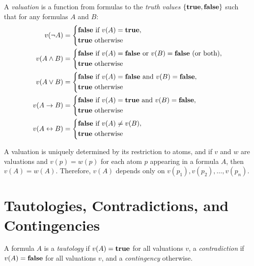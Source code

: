 \documentclass{article}
\begin{document}
\begin{definition}
    A \emph{valuation} is a function from formulas to the \emph{truth values} $\{ \mathbf{true}, \mathbf{false} \}$ such that for any formulas $A$ and $B$:
    \begin{align*}
        v(\neg A) & = \begin{dcases} \mathbf{false} \textrm{ if } v(A) = \mathbf{true}, \\ \mathbf{true} \textrm{ otherwise} \end{dcases} \\
        v(A \wedge B) & = \begin{dcases} \mathbf{false} \textrm{ if } v(A) = \mathbf{false} \textrm{ or } v(B) = \mathbf{false} \textrm{ (or both)}, \\ \mathbf{true} \textrm{ otherwise} \end{dcases} \\
        v(A \vee B) & = \begin{dcases} \mathbf{false} \textrm{ if } v(A) = \mathbf{false} \textrm{ and } v(B) = \mathbf{false}, \\ \mathbf{true} \textrm{ otherwise} \end{dcases} \\
        v(A \to B) & = \begin{dcases} \mathbf{false} \textrm{ if } v(A) = \mathbf{true} \textrm{ and } v(B) = \mathbf{false}, \\ \mathbf{true} \textrm{ otherwise}  \end{dcases} \\
        v(A \leftrightarrow B) & = \begin{dcases} \mathbf{false} \textrm{ if } v(A) \neq v(B), \\ \mathbf{true} \textrm{ otherwise} \end{dcases}
    \end{align*}
\end{definition}

\begin{proposition}
A valuation is uniquely determined by its restriction to atoms, and if $v$ and $w$ are valuations and $v(p) = w(p)$ for each atom $p$ appearing in a formula $A$, then $v(A) = w(A)$. Therefore, $v(A)$ depends only on $v(p_1), v(p_2), \dots, v(p_n)$.
\end{proposition}

\section*{Tautologies, Contradictions, and Contingencies}

\begin{definition}
    A formula $A$ is a \emph{tautology} if $v(A) = \mathbf{true}$ for all valuations $v$, a \emph{contradiction} if $v(A) = \mathbf{false}$ for all valuations $v$, and a \emph{contingency} otherwise.
\end{definition}
\end{document}
